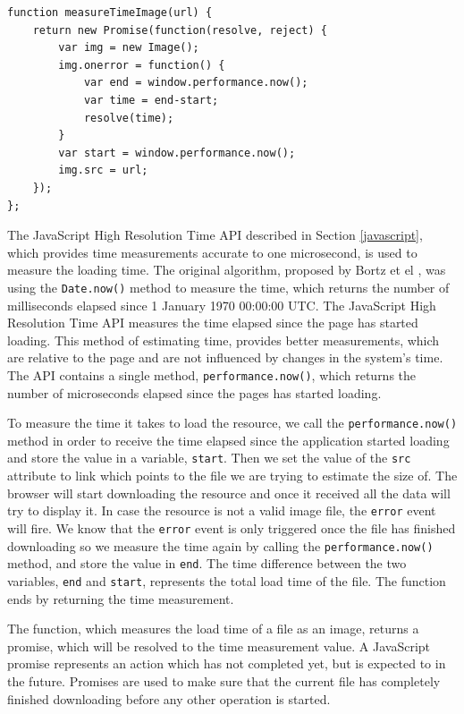 \documentclass[10pt,a4paper,twoside]{book}
\begin{document}
\begin{lstlisting}[caption={Measuring the load time of an external resource as an Image},label={vanimage}]
function measureTimeImage(url) {
    return new Promise(function(resolve, reject) {
        var img = new Image();
        img.onerror = function() {
            var end = window.performance.now();
            var time = end-start;
            resolve(time);
        }
        var start = window.performance.now();
        img.src = url;
    });
};
\end{lstlisting}

The JavaScript High Resolution Time API described in Section \ref{javascript}, which provides time measurements accurate to one microsecond, is used to measure the loading time. The original algorithm, proposed by Bortz et el \cite{bortz2007exposing}, was using the \texttt{Date.now()} \cite{datenow} method to measure the time, which returns the number of milliseconds elapsed since 1 January 1970 00:00:00 UTC. The JavaScript High Resolution Time API measures the time elapsed since the page has started loading. This method of estimating time, provides better measurements, which are relative to the page and are not influenced by changes in the system's time. The API contains a single method, \texttt{performance.now()}, which returns the number of microseconds elapsed since the pages has started loading.

To measure the time it takes to load the resource, we call the \texttt{performance.now()} method in order to receive the time elapsed since the application started loading and store the value in a variable, \texttt{start}. Then we set the value of the \texttt{src} attribute to link which points to the file we are trying to estimate the size of. The browser will start downloading the resource and once it received all the data will try to display it. In case the resource is not a valid image file, the \texttt{error} event will fire. We know that the \texttt{error} event is only triggered once the file has finished downloading so we measure the time again by calling the \texttt{performance.now()} method, and store the value in \texttt{end}. The time difference between the two variables, \texttt{end} and \texttt{start}, represents the total load time of the file. The function ends by returning the time measurement.

The function, which measures the load time of a file as an image, returns a promise, which will be resolved to the time measurement value. A JavaScript promise represents an action which has not completed yet, but is expected to in the future. Promises are used to make sure that the current file has completely finished downloading before any other operation is started. 
\end{document}
